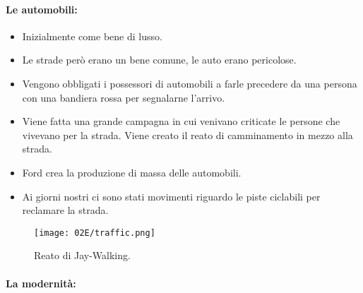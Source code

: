 \paragraph{Le automobili:}

\begin{itemize}
  \item Inizialmente come bene di lusso. 
  \item Le strade però erano un bene comune, le auto erano pericolose. 
  \item Vengono obbligati i possessori di automobili a farle precedere da una persona con una bandiera rossa per segnalarne l'arrivo. 
  \item Viene fatta una grande campagna in cui venivano criticate le persone che vivevano per la strada. Viene creato il reato di camminamento in mezzo alla strada.
  \item Ford crea la produzione di massa delle automobili.
  \item Ai giorni nostri ci sono stati movimenti riguardo le piste ciclabili per reclamare la strada.
\end{itemize}

\begin{figure}[H]
    \centering
    \texttt{[image: 02E/traffic.png]}
    \caption{Reato di Jay-Walking.}
\end{figure}

\paragraph{La modernità:}

